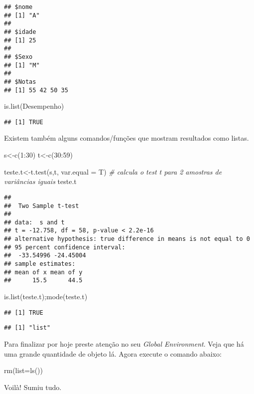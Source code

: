 \documentclass[
]{book}
\newenvironment{Shaded}{\begin{snugshade}}{\end{snugshade}}
\newcommand{\AttributeTok}[1]{\textcolor[rgb]{0.77,0.63,0.00}{#1}}
\newcommand{\CommentTok}[1]{\textcolor[rgb]{0.56,0.35,0.01}{\textit{#1}}}
\newcommand{\DecValTok}[1]{\textcolor[rgb]{0.00,0.00,0.81}{#1}}
\newcommand{\FunctionTok}[1]{\textcolor[rgb]{0.00,0.00,0.00}{#1}}
\newcommand{\NormalTok}[1]{#1}
\newcommand{\OtherTok}[1]{\textcolor[rgb]{0.56,0.35,0.01}{#1}}
\newcommand{\SpecialCharTok}[1]{\textcolor[rgb]{0.00,0.00,0.00}{#1}}
\begin{document}
\begin{verbatim}
## $nome
## [1] "A"
## 
## $idade
## [1] 25
## 
## $Sexo
## [1] "M"
## 
## $Notas
## [1] 55 42 50 35
\end{verbatim}

\begin{Shaded}
\begin{Highlighting}[]
\FunctionTok{is.list}\NormalTok{(Desempenho)}
\end{Highlighting}
\end{Shaded}

\begin{verbatim}
## [1] TRUE
\end{verbatim}

Existem também alguns comandos/funções que mostram resultados como listas.

\begin{Shaded}
\begin{Highlighting}[]
\NormalTok{s}\OtherTok{\textless{}{-}}\FunctionTok{c}\NormalTok{(}\DecValTok{1}\SpecialCharTok{:}\DecValTok{30}\NormalTok{)}
\NormalTok{t}\OtherTok{\textless{}{-}}\FunctionTok{c}\NormalTok{(}\DecValTok{30}\SpecialCharTok{:}\DecValTok{59}\NormalTok{)}

\NormalTok{teste.t}\OtherTok{\textless{}{-}}\FunctionTok{t.test}\NormalTok{(s,t, }\AttributeTok{var.equal =}\NormalTok{ T) }\CommentTok{\# calcula o test t para 2 amostras de variâncias iguais}
\NormalTok{teste.t}
\end{Highlighting}
\end{Shaded}

\begin{verbatim}
## 
##  Two Sample t-test
## 
## data:  s and t
## t = -12.758, df = 58, p-value < 2.2e-16
## alternative hypothesis: true difference in means is not equal to 0
## 95 percent confidence interval:
##  -33.54996 -24.45004
## sample estimates:
## mean of x mean of y 
##      15.5      44.5
\end{verbatim}

\begin{Shaded}
\begin{Highlighting}[]
\FunctionTok{is.list}\NormalTok{(teste.t);}\FunctionTok{mode}\NormalTok{(teste.t)}
\end{Highlighting}
\end{Shaded}

\begin{verbatim}
## [1] TRUE
\end{verbatim}

\begin{verbatim}
## [1] "list"
\end{verbatim}

Para finalizar por hoje preste atenção no seu \emph{Global Environment}.
Veja que há uma grande quantidade de objeto lá. Agora execute o comando abaixo:

\begin{Shaded}
\begin{Highlighting}[]
\FunctionTok{rm}\NormalTok{(}\AttributeTok{list=}\FunctionTok{ls}\NormalTok{())}
\end{Highlighting}
\end{Shaded}

Voilà! Sumiu tudo.

  
\end{document}
